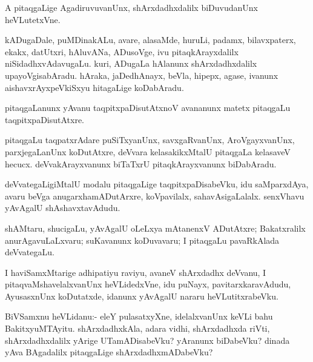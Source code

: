 \documentclass{article}
\begin{document}
\begin{mn}
A pitaqgaLige AgadiruvuvanUnx, shArxdadhxdalilx biDuvudanUnx heVLutetxVne.
\end{mn}

\begin{mn}%
kADugaDale, puMDinakALu, avare, alasaMde, huruLi, padamx,
bilavxpaterx, ekakx, datUtxri, hAluvANa, ADusoVge, ivu
pitaqkArayxdalilx niSidadhxvAdavugaLu. kuri, ADugaLa hAlanunx
shArxdadhxdalilx upayoVgisabAradu. hAraka, jaDedhAnayx, beVla, hipepx,
agase, ivanunx aishavxrAyxpeVkiSxyu hitagaLige koDabAradu.
\end{mn}

\begin{mn}%
pitaqgaLanunx yAvanu taqpitxpaDisutAtxnoV avananunx matetx pitaqgaLu taqpitxpaDisutAtxre.
\end{mn}

\begin{mn}%
pitaqgaLu taqpatxrAdare puSiTxyanUnx, savxgaRvanUnx, AroVgayxvanUnx,
parxjegaLanUnx koDutAtxre, deVvara kelasakikxMtalU pitaqgaLa kelasaveV
hecucx. deVvakArayxvanunx biTaTxrU pitaqkArayxvanunx biDabAradu.
\end{mn}

\begin{mn}
deVvategaLigiMtalU modalu pitaqgaLige taqpitxpaDisabeVku, idu
saMparxdAya, avaru beVga anugarxhamADutArxre, koVpavilalx,
sahavAsigaLalalx. senxVhavu yAvAgalU shAshavxtavAdudu.
\end{mn}

\begin{mn}
shAMtaru, shucigaLu, yAvAgalU oLeLxya mAtanenxV ADutAtxre;
Bakatxralilx anurAgavuLaLxvaru; suKavanunx koDuvavaru; I pitaqgaLu
pavaRkAlada deVvategaLu.
\end{mn}

\begin{mn}%
I haviSamxMtarige adhipatiyu raviyu, avaneV shArxdadhx deVvanu, I
pitaqvaMshavelalxvanUnx heVLidedxVne, idu puNayx, pavitarxkaravAdudu,
AyusasxnUnx koDutatxde, idanunx yAvAgalU nararu heVLutitxrabeVku.
\end{mn}

\begin{mn}%
BiVSamxnu heVLidanu:- eleY pulasatxyXne, idelalxvanUnx keVLi bahu
BakitxyuMTAyitu. shArxdadhxkAla, adara vidhi, shArxdadhxda riVti,
shArxdadhxdalilx yArige UTamADisabeVku? yAranunx biDabeVku? dinada
yAva BAgadalilx pitaqgaLige shArxdadhxmADabeVku?
\end{mn}
\end{document}
